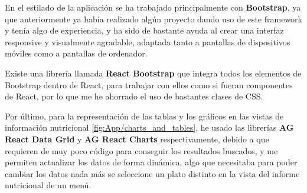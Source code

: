 En el estilado de la aplicación se ha trabajado principalmente con \textbf{Bootstrap}, ya que anteriormente ya había realizado algún proyecto dando uso de este framework y tenía algo de experiencia, y ha sido de bastante ayuda al crear una interfaz responsive y visualmente agradable, adaptada tanto a pantallas de dispositivos móviles como a pantallas de ordenador. 

Existe una librería llamada \textbf{React Bootstrap} que integra todos los elementos de Bootstrap dentro de React, para trabajar con ellos como si fueran componentes de React, por lo que me he ahorrado el uso de bastantes clases de CSS.

Por último, para la representación de las tablas y los gráficos en las vistas de información nutricional \ref{fig:App/charts_and_tables}, he usado las librerías \textbf{AG React Data Grid} y \textbf{AG React Charts} respectivamente, debido a que requieren de muy poco código para conseguir los resultados buscados, y me permiten actualizar los datos de forma dinámica, algo que necesitaba para poder cambiar los datos nada más se seleccione un plato distinto en la vista del informe nutricional de un menú.

